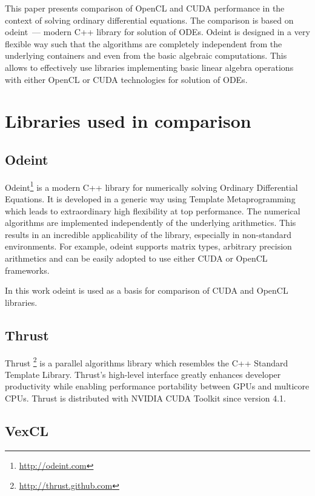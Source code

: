 \documentclass[1p]{elsarticle}
\begin{document}
This paper presents comparison of OpenCL and CUDA performance in the context of
solving ordinary differential equations. The comparison is based on odeint~---
modern C++ library for solution of ODEs. Odeint is designed in a very flexible
way such that the algorithms are completely independent from the underlying
containers and even from the basic algebraic computations. This allows to
effectively use libraries implementing basic linear algebra operations with
either OpenCL or CUDA technologies for solution of ODEs.

\section{Libraries used in comparison}

\subsection{Odeint}

Odeint\footnote{\href{http://odeint.com}{http://odeint.com}}
is a modern C++ library for numerically solving Ordinary Differential
Equations. It is developed in a generic way using Template Metaprogramming
which leads to extraordinary high flexibility at top performance. The numerical
algorithms are implemented independently of the underlying arithmetics. This
results in an incredible applicability of the library, especially in
non-standard environments. For example, odeint supports matrix types, arbitrary
precision arithmetics and can be easily adopted to use either CUDA or OpenCL
frameworks.

In this work odeint is used as a basis for comparison of CUDA and OpenCL
libraries.

\subsection{Thrust}

Thrust%
\footnote{\href{http://thrust.github.com}{http://thrust.github.com}}
is a parallel algorithms library which resembles the C++ Standard Template
Library. Thrust's high-level interface greatly enhances developer
productivity while enabling performance portability between GPUs and multicore
CPUs. Thrust is distributed with NVIDIA CUDA Toolkit since version 4.1.

\subsection{VexCL}
\end{document}
